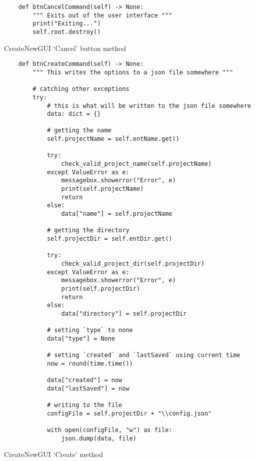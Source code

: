 \newpage
\begin{listing}[!ht]
    \begin{verbatim}
    def btnCancelCommand(self) -> None:
        """ Exits out of the user interface """
        print("Exiting...")
        self.root.destroy()
    \end{verbatim}
    \caption{CreateNewGUI `Cancel' button method}
    \label{sc:createnew-gui-cancel-method}
\end{listing}

\newpage
\begin{listing}[!ht]
    \begin{verbatim}
    def btnCreateCommand(self) -> None:
        """ This writes the options to a json file somewhere """
        
        # catching other exceptions
        try:
            # this is what will be written to the json file somewhere 
            data: dict = {}        
            
            # getting the name 
            self.projectName = self.entName.get()
            
            try:
                check_valid_project_name(self.projectName)
            except ValueError as e:
                messagebox.showerror("Error", e)
                print(self.projectName)
                return
            else:
                data["name"] = self.projectName
                
            # getting the directory
            self.projectDir = self.entDir.get()
            
            try:
                check_valid_project_dir(self.projectDir)
            except ValueError as e:
                messagebox.showerror("Error", e)
                print(self.projectDir)
                return
            else:
                data["directory"] = self.projectDir
                
            # setting `type` to none
            data["type"] = None
            
            # setting `created` and `lastSaved` using current time
            now = round(time.time())

            data["created"] = now
            data["lastSaved"] = now
    
            # writing to the file
            configFile = self.projectDir + "\\config.json"

            with open(configFile, "w") as file:
                json.dump(data, file)
    \end{verbatim}
    \caption{CreateNewGUI `Create' method}
    \label{sc:createnew-gui-create-method}
\end{listing}

